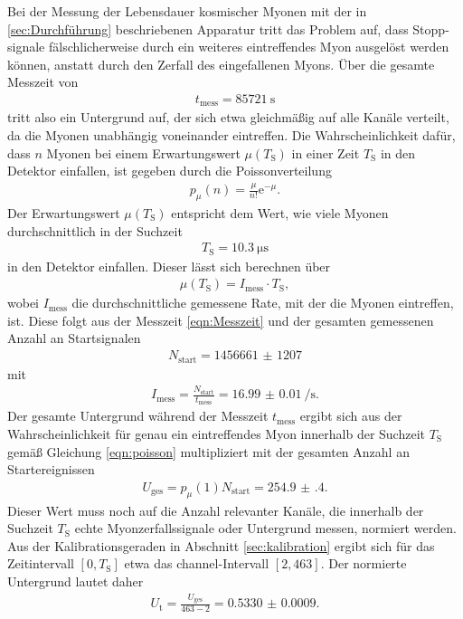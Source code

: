 Bei der Messung der Lebensdauer kosmischer Myonen mit der in \ref{sec:Durchführung} beschriebenen Apparatur
tritt das Problem auf, dass Stopp-signale fälschlicherweise durch ein weiteres eintreffendes Myon ausgelöst werden können,
anstatt durch den Zerfall des eingefallenen Myons. Über die gesamte Messzeit von
\begin{align}
  t_\text{mess} = \SI{85721}{\second}
  \label{eqn:Messzeit}
\end{align}
tritt also ein Untergrund auf, der sich etwa gleichmäßig auf alle Kanäle verteilt, da die Myonen unabhängig voneinander eintreffen.
Die Wahrscheinlichkeit dafür, dass $n$ Myonen bei einem Erwartungswert $\mu(T_\text{S})$ in einer Zeit $T_\text{S}$ in den Detektor einfallen, ist gegeben durch die Poissonverteilung
\begin{align}
  p_\mu(n) = \frac{\mu}{n!} \mathrm{e}^{-\mu}.
\end{align}
Der Erwartungswert $\mu(T_\text{S})$ entspricht dem Wert, wie viele Myonen durchschnittlich in der Suchzeit
\begin{align}
  T_\text{S} = \SI{10.3}{\micro\second}
\end{align}
in den Detektor einfallen. Dieser lässt sich berechnen über
\begin{align}
  \mu(T_\text{S}) = I_\text{mess} \cdot T_\text{S},
  \label{eqn:poisson}
\end{align}
wobei $I_\text{mess}$ die durchschnittliche gemessene Rate, mit der die Myonen eintreffen, ist.
Diese folgt aus der Messzeit \eqref{eqn:Messzeit} und der gesamten gemessenen Anzahl an Startsignalen
\begin{align}
  N_\text{start} = \num{1456661(1207)}
\end{align}
mit
\begin{align}
  I_\text{mess} = \frac{N_\text{start}}{t_\text{mess}} = \SI{16.99(1)}{\per\second}.
\end{align}
Der gesamte Untergrund während der Messzeit $t_\text{mess}$ ergibt sich aus der Wahrscheinlichkeit für
genau ein eintreffendes Myon innerhalb der Suchzeit $T_\text{S}$ gemäß Gleichung \eqref{eqn:poisson} multipliziert mit der
gesamten Anzahl an Startereignissen
\begin{align}
  U_\text{ges} = p_\mu(1) N_\text{start} = \num{254.9(4)}.
\end{align}
Dieser Wert muss noch auf die Anzahl relevanter Kanäle, die innerhalb der Suchzeit $T_\text{S}$ echte Myonzerfallssignale
oder Untergrund messen, normiert werden. Aus der Kalibrationsgeraden in Abschnitt \ref{sec:kalibration} ergibt sich für das
Zeitintervall $[0,T_\text{S}]$ etwa das channel-Intervall $[2,463]$. Der normierte Untergrund lautet daher
\begin{align}
  U_\text{t} = \frac{U_\text{ges}}{463-2} = \num{0.5330(9)}.
  \label{eqn:Utheo}
\end{align}

